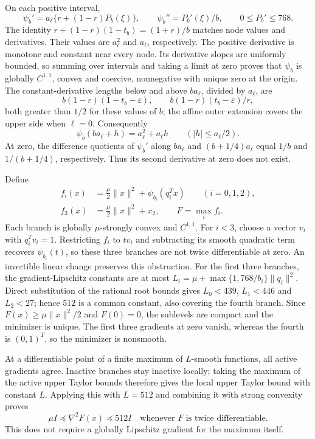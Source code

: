 On each positive interval,
\[
 \psi_b'=a_\ell\{r+(1-r)P_b(\xi)\},\qquad
 \psi_b''=P_b'(\xi)/b,\qquad0\le P_b'\le768.
\]
The identity $r+(1-r)(1-t_b)=(1+r)/b$ matches node values and
derivatives. Their values are $a_\ell^2$ and $a_\ell$, respectively.
The positive derivative is monotone and constant near every node.
Its derivative slopes are uniformly bounded, so summing over intervals
and taking a limit at zero proves that $\psi_b$ is globally $C^{1,1}$,
convex and coercive, nonnegative with unique zero at the origin.
The constant-derivative lengths below and above $ba_\ell$, divided by $a_\ell$, are
\[
 b(1-r)(1-t_b-\varepsilon),\qquad
 b(1-r)(t_b-\varepsilon)/r,
\]
both greater than $1/2$ for these values of $b$; the affine outer extension
covers the upper side when $\ell=0$. Consequently
\begin{equation}\label{art:lower_plateau}
 \psi_b(ba_\ell+h)=a_\ell^2+a_\ell h\qquad(|h|\le a_\ell/2).
\end{equation}
At zero, the difference quotients of $\psi_b'$ along $ba_\ell$ and
$(b+1/4)a_\ell$ equal $1/b$ and $1/(b+1/4)$, respectively. Thus its second
derivative at zero does not exist.

Define
\begin{equation}\label{art:lower_objective}
 \begin{aligned}
 f_i(x)&=\tfrac\mu2\|x\|^2+\psi_{b_i}(q_i^Tx)\qquad(i=0,1,2),\\
 f_3(x)&=\tfrac\mu2\|x\|^2+x_2,\qquad F=\max_i f_i.
 \end{aligned}
\end{equation}
Each branch is globally $\mu$-strongly convex and $C^{1,1}$.
For $i<3$, choose a vector $v_i$ with $q_i^Tv_i=1$.
Restricting $f_i$ to $tv_i$ and subtracting its smooth quadratic term
recovers $\psi_{b_i}(t)$, so these three branches are not twice
differentiable at zero. An invertible linear change preserves this obstruction.
For the first three branches, the gradient-Lipschitz constants are at most
$L_i=\mu+\max\{1,768/b_i\}\|q_i\|^2$. Direct substitution of the
rational root bounds gives $L_0<439$, $L_1<446$ and $L_2<27$; hence
$512$ is a common constant, also covering the fourth branch.
Since $F(x)\ge\mu\|x\|^2/2$ and $F(0)=0$, the
sublevels are compact and the minimizer is unique. The first three
gradients at zero vanish, whereas the fourth is $(0,1)^T$, so the
minimizer is nonsmooth.

At a differentiable point of a finite maximum of $L$-smooth functions,
all active gradients agree. Inactive branches stay inactive locally;
taking the maximum of the active upper Taylor bounds therefore gives
the local upper Taylor bound with constant $L$. Applying this with
$L=512$ and combining it with strong convexity proves
\[
 \mu I\preceq\nabla^2F(x)\preceq512I
 \quad\text{whenever }F\text{ is twice differentiable}.
\]
This does not require a globally Lipschitz gradient for the maximum itself.

